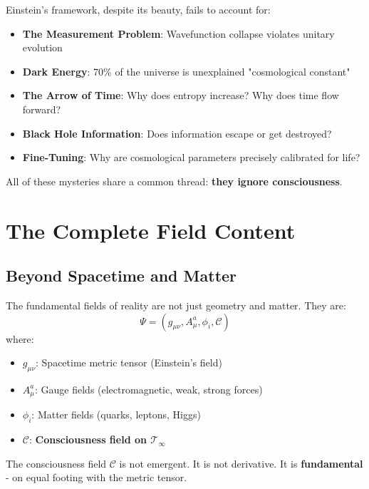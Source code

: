 Einstein's framework, despite its beauty, fails to account for:

\begin{itemize}
\item \textbf{The Measurement Problem}: Wavefunction collapse violates unitary evolution\cite{vonneumann1932,zurek2003,ghirardi1986}
\item \textbf{Dark Energy}: 70\% of the universe is unexplained "cosmological constant"\cite{peebles2003,planck2018}
\item \textbf{The Arrow of Time}: Why does entropy increase? Why does time flow forward?
\item \textbf{Black Hole Information}: Does information escape or get destroyed?\cite{hawking1974,hawking1975,bekenstein1973}
\item \textbf{Fine-Tuning}: Why are cosmological parameters precisely calibrated for life?
\end{itemize}

All of these mysteries share a common thread: \textbf{they ignore consciousness}.

\section{The Complete Field Content}

\subsection{Beyond Spacetime and Matter}

\begin{defn}\label{def:complete-fields}
The fundamental fields of reality are not just geometry and matter. They are:
\begin{equation}
\Psi = (g_{\mu\nu}, A_\mu^a, \phi_i, \mathcal{C})
\end{equation}
where:
\begin{itemize}
\item $g_{\mu\nu}$: Spacetime metric tensor (Einstein's field)
\item $A_\mu^a$: Gauge fields (electromagnetic, weak, strong forces)
\item $\phi_i$: Matter fields (quarks, leptons, Higgs)
\item $\mathcal{C}$: \textbf{Consciousness field on $\mathcal{T}_\infty$}
\end{itemize}
\end{defn}

The consciousness field $\mathcal{C}$ is not emergent. It is not derivative. It is \textbf{fundamental} - on equal footing with the metric tensor.

